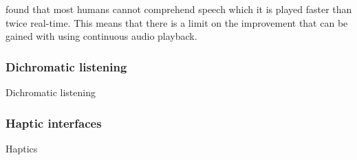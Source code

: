 \citet{Arons1997} found that most humans cannot comprehend speech which it is played faster than twice real-time. This
means that there is a limit on the improvement that can be gained with using continuous audio playback.

\subsubsection{Dichromatic listening}
Dichromatic listening \citep{Ranjan2006}

\subsubsection{Haptic interfaces}
Haptics
\citep{Metatla2016}






